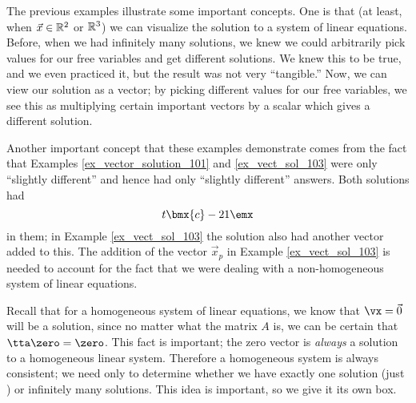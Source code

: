 \medskip

The previous examples illustrate some important concepts. One is that (at least, when $\vec x\in \mathbb{R}^2$ or $\mathbb{R}^3$) we can visualize the solution to a system of linear equations. Before, when we had infinitely many solutions, we knew we could arbitrarily pick values for our free variables and get different solutions. We knew this to be true, and we even practiced it, but the result was not very ``tangible.'' Now, we can view our solution as a vector; by picking different values for our free variables, we see this as multiplying certain important vectors by a scalar which gives a different solution.



Another important concept that these examples demonstrate comes from the fact that Examples \ref{ex_vector_solution_101} and \ref{ex_vect_sol_103} were only ``slightly different'' and hence had only ``slightly different'' answers. Both solutions had 
\[
t\bmx{c}-2\\1\emx
\]
in them; in Example \ref{ex_vect_sol_103} the solution also had another vector added to this. The addition of the vector $\vec{x}_p$ in Example \ref{ex_vect_sol_103} is needed to account for the fact that we were dealing with a non-homogeneous system of linear equations.

Recall that for a homogeneous system of linear equations, we know that $\vx = \vec 0$ will be a solution, since no matter what the matrix $A$ is, we can be certain that $\tta\zero = \zero$.  This fact is important; the zero vector is \textit{always} a solution to a homogeneous linear system. Therefore a homogeneous system is always consistent; we need only to determine whether we have exactly one solution (just \zero) or infinitely many solutions. This idea is important, so we give it its own box.

\smallskip


